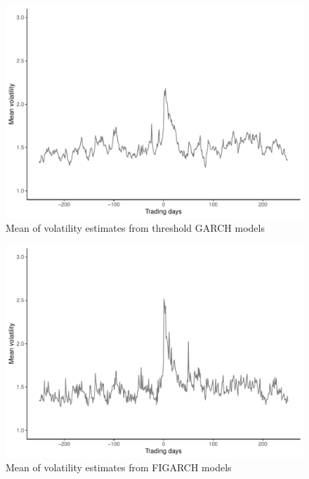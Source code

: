 \documentclass[12pt,final,fleqn]{article}
\theoremstyle{plain}
\begin{document}
\begin{figure}[H]
\includegraphics[scale = 0.75]{../figs/mean-volatility-tgarch.pdf}
\caption{Mean of volatility estimates from threshold GARCH models}
\label{fig:tgarch}
\end{figure}

\begin{figure}[H]
\includegraphics[scale = 0.75]{../figs/mean-volatility-figarch.pdf}
\caption{Mean of volatility estimates from FIGARCH models}
\label{fig:figarch}
\end{figure}
\end{document}
